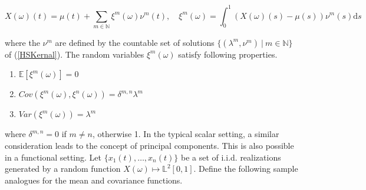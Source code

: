 \documentclass[11pt,twoside,a4paper]{article}
\begin{document}
	
	\begin{equation}\label{KarhunenLoeve}
		X(\omega)(t) = \mu(t) + \sum_{m \in \mathbb{N}} \xi^m(\omega) \nu^m(t), \quad \xi^m(\omega) =  \int_{0}^{1} \left(X(\omega)(s) - \mu(s)\right) \nu^m(s) \mathrm{d}s
	\end{equation}
	
	where the $\nu^m$ are defined by the countable set of solutions $\{(\lambda^m, \nu^m) \: \vert \: m \in \mathbb{N}\}$ of ({\ref{HSKernal}}). The random variables $\xi^{m}(\omega)$ satisfy following properties. %
	
	
	\begin{multicols}{2}
		\begin{enumerate}
			\item $\mathbb{E}\left[\xi^m(\omega)\right] = 0$
			\item $Cov\left(\xi^m(\omega), \xi^n(\omega)\right) = \delta^{m,n}\lambda^m$%
			\item $Var\left(\xi^m(\omega)\right) = \lambda^m$
		\end{enumerate}
	\end{multicols}
	where $\delta^{m,n} = 0$ if $m \neq n$, otherwise 1.
	In the typical scalar setting, a similar consideration leads to the concept of principal components. This is also possible in a functional setting. Let $\{x_1(t), \dots, x_n(t)\}$ be a set of i.i.d. realizations generated by a random function $X(\omega) \mapsto \mathbb{L}^2[0,1]$.
	Define the following sample analogues for the mean and covariance functions.
	
\end{document}
